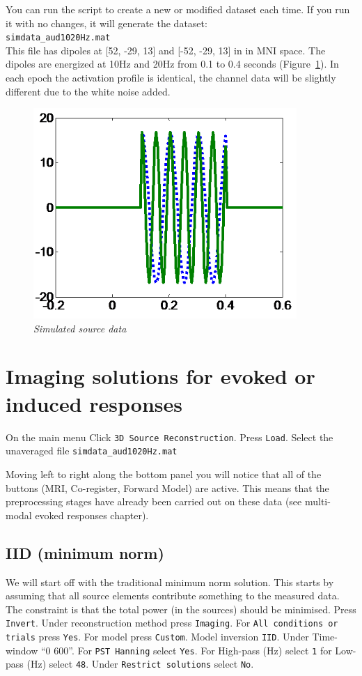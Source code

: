 You can run the script to create a new or modified dataset each time. If you run it with no changes, it will generate the dataset:
\\
\texttt{simdata\_aud1020Hz.mat}
\\
This file has dipoles at [52, -29, 13] and  [-52, -29, 13] in  in MNI space. The dipoles are energized at 10Hz and 20Hz from 0.1 to 0.4 seconds (Figure~\ref{meg_sloc:fig:1}). In each epoch the activation profile is identical, the channel data will be slightly different due to the white noise added.

\begin{figure}
\begin{center}
\includegraphics[width=100mm]{meg_sloc/slide1}
\caption{\em Simulated source data \label{meg_sloc:fig:1}}
\end{center}
\end{figure}


\section{Imaging solutions for evoked or induced responses}

On the main menu Click \texttt{3D Source Reconstruction}. Press \texttt{Load}. Select the unaveraged file \texttt{simdata\_aud1020Hz.mat}

Moving left to right along the bottom panel you will notice that all of the buttons (MRI, Co-register, Forward Model) are active. This means that the preprocessing stages have already been carried out on these data (see multi-modal evoked responses chapter).

\subsection{IID (minimum norm)}
We will start off with the traditional minimum norm solution. This starts by assuming that all source elements contribute something to the measured data. The constraint is that the total power (in the sources) should be minimised.
Press \texttt{Invert}. Under reconstruction method press \texttt{Imaging}. For \texttt{All conditions or trials} press \texttt{Yes}. For model press \texttt{Custom}. Model inversion \texttt{IID}. Under Time-window ``0 600''. For \texttt{PST Hanning} select \texttt{Yes}. For High-pass (Hz) select \texttt{1} for Low-pass (Hz) select \texttt{48}. Under \texttt{Restrict solutions} select \texttt{No}. 

